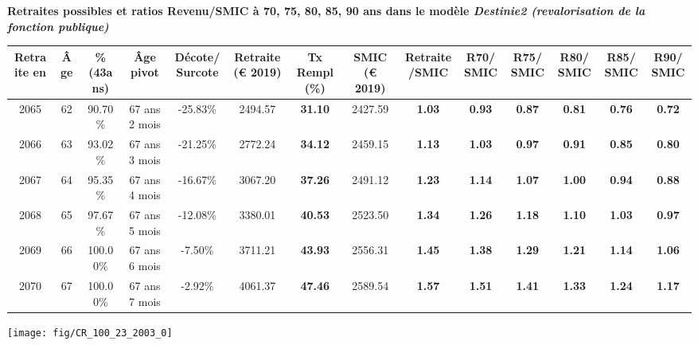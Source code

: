  \vspace{0.1cm} 
{\bf \noindent Retraites possibles et ratios Revenu/SMIC à 70, 75, 80, 85, 90 ans dans le modèle \emph{Destinie2 (revalorisation de la fonction publique)}}  
 
\begin{adjustbox}{max width=\textwidth} 
\begin{tabular}[htb]{|c|c||c|c|c||c|c||c|c||c|c|c|c|c|} 
\hline 
 Retraite en &  Âge &  \%(43ans) &  Âge pivot &  Décote/Surcote &  Retraite (\euro{} 2019) &  Tx Rempl(\%) &  SMIC (\euro{} 2019) &  Retraite/SMIC &  R70/SMIC &  R75/SMIC &  R80/SMIC &  R85/SMIC &  R90/SMIC \\ 
\hline \hline 
 2065 &  62 &  90.70\% &  67 ans 2 mois &  -25.83\% &  2494.57 &  {\bf 31.10} &  2427.59 &  {\bf 1.03} &  {\bf {\color{red} 0.93}} &  {\bf {\color{red} 0.87}} &  {\bf {\color{red} 0.81}} &  {\bf {\color{red} 0.76}} &  {\bf {\color{red} 0.72}} \\ 
\hline 
 2066 &  63 &  93.02\% &  67 ans 3 mois &  -21.25\% &  2772.24 &  {\bf 34.12} &  2459.15 &  {\bf 1.13} &  {\bf 1.03} &  {\bf {\color{red} 0.97}} &  {\bf {\color{red} 0.91}} &  {\bf {\color{red} 0.85}} &  {\bf {\color{red} 0.80}} \\ 
\hline 
 2067 &  64 &  95.35\% &  67 ans 4 mois &  -16.67\% &  3067.20 &  {\bf 37.26} &  2491.12 &  {\bf 1.23} &  {\bf 1.14} &  {\bf 1.07} &  {\bf 1.00} &  {\bf {\color{red} 0.94}} &  {\bf {\color{red} 0.88}} \\ 
\hline 
 2068 &  65 &  97.67\% &  67 ans 5 mois &  -12.08\% &  3380.01 &  {\bf 40.53} &  2523.50 &  {\bf 1.34} &  {\bf 1.26} &  {\bf 1.18} &  {\bf 1.10} &  {\bf 1.03} &  {\bf {\color{red} 0.97}} \\ 
\hline 
 2069 &  66 &  100.00\% &  67 ans 6 mois &  -7.50\% &  3711.21 &  {\bf 43.93} &  2556.31 &  {\bf 1.45} &  {\bf 1.38} &  {\bf 1.29} &  {\bf 1.21} &  {\bf 1.14} &  {\bf 1.06} \\ 
\hline 
 2070 &  67 &  100.00\% &  67 ans 7 mois &  -2.92\% &  4061.37 &  {\bf 47.46} &  2589.54 &  {\bf 1.57} &  {\bf 1.51} &  {\bf 1.41} &  {\bf 1.33} &  {\bf 1.24} &  {\bf 1.17} \\ 
\hline 
\hline 
\end{tabular} 
\end{adjustbox} 
 
 \vspace{0.1cm} 

 {\hspace{-2.2cm}\texttt{[image: fig/CR\_100\_23\_2003\_0]}} 

